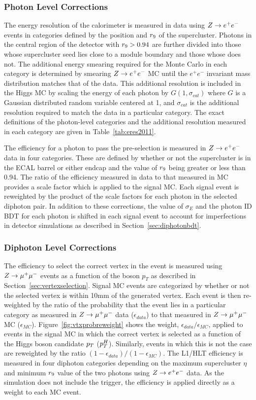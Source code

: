 \subsubsection{Photon Level Corrections}
The energy resolution of the calorimeter is measured in data using $Z\rightarrow e^{+}e^{-}$ events in
categories defined by the position and $r_{9}$ of the supercluster. 
Photons in the central region of the detector
with $r_{9} > 0.94$ are further divided into those whose supercluster seed lies close to a module 
boundary and those whose does not. 
The additional energy smearing required for the Monte Carlo in each category is determined
by smearing $Z\rightarrow e^{+}e^{-}$ MC until the $e^{+} e^{−}$ invariant mass distribution matches that
of the data. 
This additional resolution is included in the Higgs MC by scaling the energy of each photon by 
$G(1,\sigma_{cat})$ where $G$ is a Gaussian distributed random variable centered
at 1, and $\sigma_{cat}$ is the additional resolution required to match the data in a particular category.
The exact definitions of the photon-level categories and the additional resolution measured in each category
are given in Table~\ref{tab:eres2011}.
 
The efficiency for a photon to pass the pre-selection is measured in $Z\rightarrow e^{+}e^{-}$ data in four categories.
These are defined by whether or not the supercluster is in the ECAL barrel or either endcap and the value 
of $r_{9}$ being greater or less than 0.94. 
The ratio of the efficiency measured in data to that measured in MC provides a scale factor which is
applied to the signal MC. Each signal event is reweighted by the product of the scale factors
for each photon in the selected diphoton pair. In addition to these corrections, the value of $\sigma_{E}$ and the photon ID BDT for each photon is 
shifted in each signal event to account for imperfections in detector simulations as described in 
Section~\ref{sec:diphotonbdt}.

\subsubsection{Diphoton Level Corrections}
The efficiency to select the correct vertex in the event is measured using $Z\rightarrow \mu^{+}\mu^{-}$ events as a
function of the boson $p_{T}$ as described in Section~\ref{sec:vertexselection}. 
Signal MC events are categorized by whether or not the 
selected vertex is within 10mm of the generated vertex. Each event is then re-weighted by
the ratio of the probability that the event lies in a particular category
as measured in $Z\rightarrow \mu^{+}\mu^{-}$ data ($\epsilon_{data}$) to that measured in $Z\rightarrow \mu^{+}\mu^{-}$ MC ($\epsilon_{MC}$). Figure~\ref{fig:vtxprobreweight} 
shows the weight, $\epsilon_{data}/\epsilon_{MC}$, applied to events in the signal MC in which the correct vertex is selected
as a function of the Higgs boson candidate $p_{T}$ ($p_{T}^{H}$). Similarly, events in which this is not
the case are reweighted by the ratio  $(1-\epsilon_{data})/(1-\epsilon_{MC})$. 
The L1/HLT efficiency is measured in four diphoton categories depending on the maximum
supercluster $\eta$ and minimum $r_{9}$ value of the two photons using $Z\rightarrow e^{+}e^{-}$ data. 
As the simulation does not include the trigger, the efficiency is applied 
directly as a weight to each MC event.

